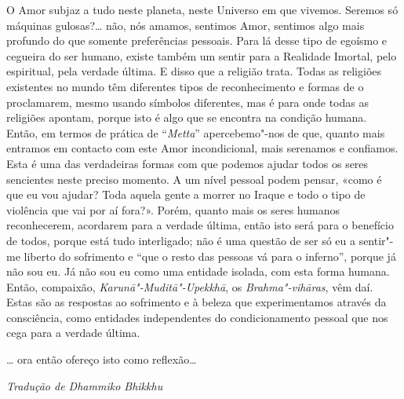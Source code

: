 O Amor subjaz a tudo neste planeta, neste Universo em que vivemos.
Seremos só máquinas gulosas?\ldots{} não, nós amamos, sentimos Amor, sentimos
algo mais profundo do que somente preferências pessoais. Para lá desse
tipo de egoísmo e cegueira do ser humano, existe também um sentir para a
Realidade Imortal, pelo espiritual, pela verdade última. E disso que a
religião trata. Todas as religiões existentes no mundo têm diferentes
tipos de reconhecimento e formas de o proclamarem, mesmo usando símbolos
diferentes, mas é para onde todas as religiões apontam, porque isto é
algo que se encontra na condição humana. Então, em termos de prática de
``\emph{Metta}'' apercebemo"-nos de que, quanto mais entramos em contacto
com este Amor incondicional, mais serenamos e confiamos. Esta é uma das
verdadeiras formas com que podemos ajudar todos os seres sencientes
neste preciso momento. A um nível pessoal podem pensar, «como é que eu
vou ajudar? Toda aquela gente a morrer no Iraque e todo o tipo de
violência que vai por aí fora?». Porém, quanto mais os seres humanos
reconhecerem, acordarem para a verdade última, então isto será para o
benefício de todos, porque está tudo interligado; não é uma questão de
ser só eu a sentir"-me liberto do sofrimento e ``que o resto das pessoas
vá para o inferno'', porque já não sou eu. Já não sou eu como uma
entidade isolada, com esta forma humana. Então, compaixão,
\emph{Karunā"-Muditā"-Upekkhā}, os \emph{Brahma"-vihāras}, vêm daí. Estas
são as respostas ao sofrimento e à beleza que experimentamos através da
consciência, como entidades independentes do condicionamento pessoal que
nos cega para a verdade última.

\ldots{} ora então ofereço isto como reflexão\ldots{}

\bigskip

{\raggedleft\itshape
  Tradução de Dhammiko Bhikkhu
\par}
